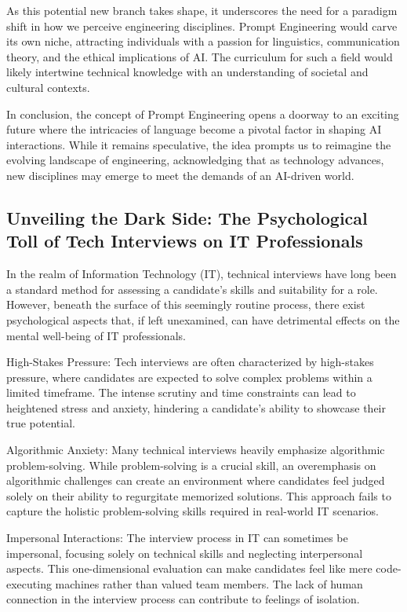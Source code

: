 \documentclass[
    a4paper, %
    10pt, %
    unnumberedsections, %
    twoside, %
]{LTJournalArticle}
\begin{document}
As this potential new branch takes shape, it underscores the need for a paradigm shift in how we perceive engineering disciplines. Prompt Engineering would carve its own niche, attracting individuals with a passion for linguistics, communication theory, and the ethical implications of AI. The curriculum for such a field would likely intertwine technical knowledge with an understanding of societal and cultural contexts.

In conclusion, the concept of Prompt Engineering opens a doorway to an exciting future where the intricacies of language become a pivotal factor in shaping AI interactions. While it remains speculative, the idea prompts us to reimagine the evolving landscape of engineering, acknowledging that as technology advances, new disciplines may emerge to meet the demands of an AI-driven world.






\subsection{Unveiling the Dark Side: The Psychological Toll of Tech Interviews on IT Professionals}


In the realm of Information Technology (IT), technical interviews have long been a standard method for assessing a candidate's skills and suitability for a role. However, beneath the surface of this seemingly routine process, there exist psychological aspects that, if left unexamined, can have detrimental effects on the mental well-being of IT professionals.

High-Stakes Pressure:
Tech interviews are often characterized by high-stakes pressure, where candidates are expected to solve complex problems within a limited timeframe. The intense scrutiny and time constraints can lead to heightened stress and anxiety, hindering a candidate's ability to showcase their true potential.

Algorithmic Anxiety:
Many technical interviews heavily emphasize algorithmic problem-solving. While problem-solving is a crucial skill, an overemphasis on algorithmic challenges can create an environment where candidates feel judged solely on their ability to regurgitate memorized solutions. This approach fails to capture the holistic problem-solving skills required in real-world IT scenarios.

Impersonal Interactions:
The interview process in IT can sometimes be impersonal, focusing solely on technical skills and neglecting interpersonal aspects. This one-dimensional evaluation can make candidates feel like mere code-executing machines rather than valued team members. The lack of human connection in the interview process can contribute to feelings of isolation.
\end{document}
